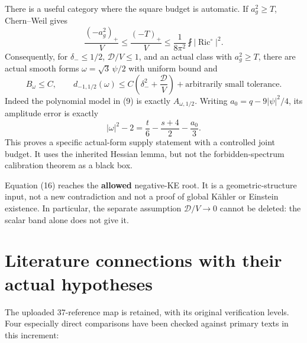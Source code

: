 \documentclass[
  11pt,
]{article}
\begin{document}
There is a useful category where the square budget is automatic. If
\(a_g^2\ge T\), Chern--Weil gives \[
\frac{(-a_g^2)_+}{V}
\le\frac{(-T)_+}{V}
\le\frac1{8\pi^2}\fint|\operatorname{Ric}^{\circ}|^2.
\tag{15}
\] Consequently, for \(\delta_-\le1/2\), \(\mathscr D/V\le1\), and an
actual class with \(a_g^2\ge T\), there are actual smooth forms
\(\omega=\sqrt3\,\psi/2\) with uniform bound and \[
B_\omega\le C,\qquad
d_{-1,1/2}(\omega)\le
C\left(\delta_-^2+\frac{\mathscr D}{V}\right)
+\text{arbitrarily small tolerance}.
\tag{16}
\] Indeed the polynomial model in (9) is exactly \(A_{\omega,1/2}\).
Writing \(a_0=q-9|\psi|^2/4\), its amplitude error is exactly \[
|\omega|^2-2=\frac t6-\frac{s+4}{2}-\frac{a_0}{3}.
\] This proves a specific actual-form supply statement with a controlled
joint budget. It uses the inherited Hessian lemma, but not the
forbidden-spectrum calibration theorem as a black box.

Equation (16) reaches the \textbf{allowed} negative-KE root. It is a
geometric-structure input, not a new contradiction and not a proof of
global Kähler or Einstein existence. In particular, the separate
assumption \(\mathscr D/V\to0\) cannot be deleted: the scalar band alone
does not give it.

\hypertarget{literature-connections-with-their-actual-hypotheses}{%
\section{Literature connections with their actual
hypotheses}\label{literature-connections-with-their-actual-hypotheses}}

The uploaded 37-reference map is retained, with its original
verification levels. Four especially direct comparisons have been
checked against primary texts in this increment:
\end{document}
